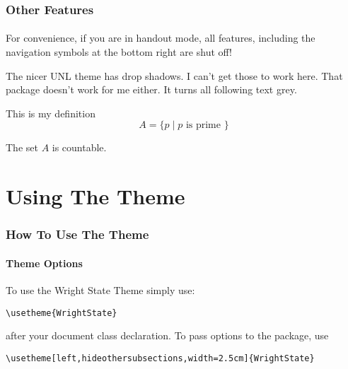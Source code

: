 \documentclass{beamer}
\begin{document}
\begin{frame}  %
    \frametitle{Other Features}
    \framesubtitle{}
    
    For convenience, if you are in handout mode, all features, including the
    navigation symbols at the bottom right are shut off!

The nicer UNL theme has drop shadows. I can't get those to work here. That package doesn't work for me either. It turns all following text grey.

    \begin{definition}
      This is my definition
      $$A = \{p \mid \textrm{$p$ is prime }\}$$
    \end{definition}
\end{frame}
\begin{frame}    
    \begin{theorem}
      The set $A$ is countable.
    \end{theorem}

\end{frame}

\section{Using The Theme}

\begin{frame}[fragile]
    \frametitle{How To Use The Theme}
    \framesubtitle{Theme Options}
    
    To use the Wright State Theme simply use:
    
    \begin{verbatim}\usetheme{WrightState}\end{verbatim}
    
    after your document class declaration. To pass options to the package, use
    
    \verb"\usetheme[left,hideothersubsections,width=2.5cm]{WrightState}"
    
\end{frame}
\end{document}
